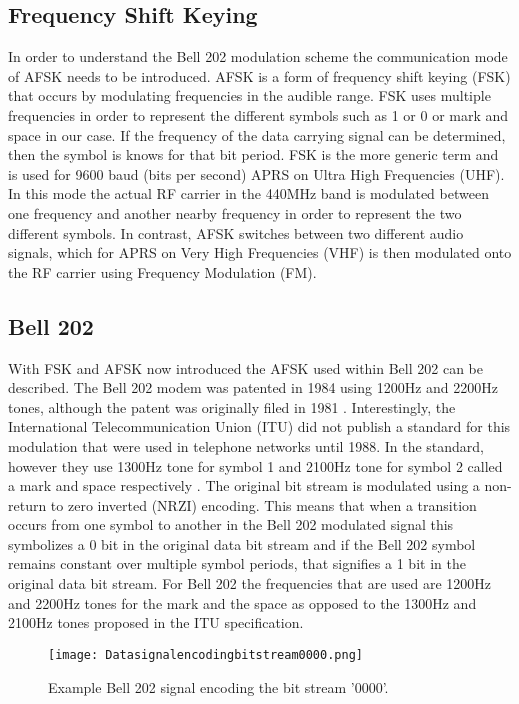 \subsection{Frequency Shift Keying}
In order to understand the Bell 202 modulation scheme the communication mode of AFSK needs to be introduced. AFSK is a form of frequency shift keying (FSK) that occurs by modulating frequencies in the audible range. FSK uses multiple frequencies in order to represent the different symbols such as 1 or 0 or mark and space in our case. If the frequency of the data carrying signal can be determined, then the symbol is knows for that bit period. FSK is the more generic term and is used for 9600 baud (bits per second) APRS on Ultra High Frequencies (UHF). In this mode the actual RF carrier in the 440MHz band is modulated between one frequency and another nearby frequency in order to represent the two different symbols. In contrast, AFSK switches between two different audio signals, which for APRS on Very High Frequencies (VHF) is then modulated onto the RF carrier using Frequency Modulation (FM).


\subsection{Bell 202}
With FSK and AFSK now introduced the AFSK used within Bell 202 can be described. The Bell 202 modem was patented in 1984 using 1200Hz and 2200Hz tones, although the patent was originally filed in 1981 \cite{stauffer1984fsk}. Interestingly, the International Telecommunication Union (ITU) did not publish a standard for this modulation that were used in telephone networks until 1988. In the standard, however they use 1300Hz tone for symbol 1 and 2100Hz tone for symbol 2 called a mark and space respectively \cite{ITUV23}. The original bit stream is modulated using a non-return to zero inverted (NRZI) encoding. This means that when a transition occurs from one symbol to another in the Bell 202 modulated signal this symbolizes a 0 bit in the original data bit stream and if the Bell 202 symbol remains constant over multiple symbol periods, that signifies a 1 bit in the original data bit stream. For Bell 202 the frequencies that are used are 1200Hz and 2200Hz tones for the mark and the space as opposed to the 1300Hz and 2100Hz tones proposed in the ITU specification.
\begin{figure}
  \centering
	\texttt{[image: Datasignalencodingbitstream0000.png]} 
	\caption{Example Bell 202 signal encoding the bit stream '0000'.}
	\label{exampleBitStream}
\end{figure}
